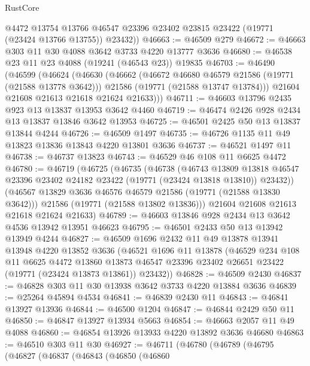 \begin{lexlean}{RustCore}
\begin{coremodule}
        @4472
        @13754
        @13766
        @46547
        @23396
        @23402
        @23815
        @23422
        (@19771 (@23424 @13766 @13755))
        @23432))
@46663 := @46509 @279
@46672 := @46663 @303 @11 @30 @4088 @3642 @3733 @4220 @13777 @3636
@46680 := @46538 @23 @11 @23 @4088 (@19241 (@46543 @23)) @19835
@46703 := @46490
    (@46599
      (@46624
        (@46630
          (@46662
            (@46672 @46680 @46579 @21586 (@19771 (@21588 @13778 @3642)))
            @21586
            (@19771 (@21588 @13747 @13784)))
          @21604
          @21608
          @21613
          @21618
          @21624
          @21633)))
@46711 := @46603 @13796 @2435 @923 @13 @13837 @13953 @3642 @4460
@46719 := @46474 @2426 @928 @2434 @13 @13837 @13846 @3642 @13953
@46725 := @46501 @2425 @50 @13 @13837 @13844 @4244
@46726 := @46509 @1497
@46735 := @46726 @1135 @11 @49 @13823 @13836 @13843 @4220 @13801 @3636
@46737 := @46521 @1497 @11
@46738 := @46737 @13823
@46743 := @46529 @46 @108 @11 @6625 @4472
@46780 := @46719
    (@46725
      (@46735
        (@46738
          (@46743
            @13809
            @13818
            @46547
            @23396
            @23402
            @24182
            @23422
            (@19771 (@23424 @13818 @13810))
            @23432))
        (@46567 @13829 @3636 @46576 @46579 @21586 (@19771 (@21588 @13830 @3642)))
        @21586
        (@19771 (@21588 @13802 @13836)))
      @21604
      @21608
      @21613
      @21618
      @21624
      @21633)
@46789 := @46603 @13846 @928 @2434 @13 @3642 @4536 @13942 @13951 @46623
@46795 := @46501 @2433 @50 @13 @13942 @13949 @4244
@46827 := @46509
    @1696
    @2432
    @11
    @49
    @13878
    @13941
    @13948
    @4220
    @13852
    @3636
    (@46521
      @1696
      @11
      @13878
      (@46529
        @234
        @108
        @11
        @6625
        @4472
        @13860
        @13873
        @46547
        @23396
        @23402
        @26651
        @23422
        (@19771 (@23424 @13873 @13861))
        @23432))
@46828 := @46509 @2430
@46837 := @46828 @303 @11 @30 @13938 @3642 @3733 @4220 @13884 @3636
@46839 := @25264 @45894 @4534
@46841 := @46839 @2430 @11
@46843 := @46841 @13927 @13936
@46844 := @46500 @1204
@46847 := @46844 @2429 @50 @11
@46850 := @46847 @13927 @13934 @5663
@46854 := @46663 @2057 @11 @49 @4088
@46860 := @46854 @13926 @13933 @4220 @13892 @3636 @46680
@46863 := @46510 @303 @11 @30
@46927 := @46711
    (@46780
      (@46789
        (@46795
          (@46827
            (@46837
              (@46843
                (@46850
                  (@46860

\end{coremodule}
\end{lexlean}
